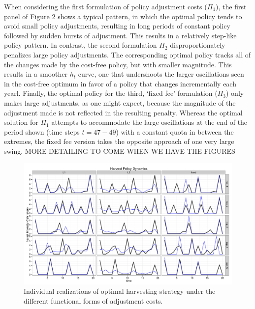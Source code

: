 \documentclass{article}\usepackage{graphicx, color}
\makeatletter
\def\maxwidth{ %
  \ifdim\Gin@nat@width>\linewidth
    \linewidth
  \else
    \Gin@nat@width
  \fi
}
\newenvironment{knitrout}{}{} %
\makeatother
\begin{document}
When considering the first formulation of policy adjustment costs ($\Pi_1$), the first  panel of Figure 2 shows a typical pattern, in which the optimal policy tends to avoid small policy adjustments, resulting in long periods of constant policy followed by sudden bursts of adjustment. This results in a relatively step-like policy pattern.  In contrast, the second formulation $\Pi_2$ disproportionately penalizes large policy adjustments. The corresponding optimal policy tracks all of the changes made by the cost-free policy, but with smaller magnitude.  This results in a smoother $h_t$ curve, one that undershoots the larger oscillations seen in the cost-free optimum in favor of a policy that changes incrementally each yearl.  Finally, the optimal policy for the third, `fixed fee' formulation ($\Pi_3$) only makes large adjustments, as one might expect, because the magnitude of the adjustment made is not reflected in the resulting penalty.  Whereas the optimal solution for $\Pi_1$ attempts to accommodate the large oscillations at the end of the period shown (time steps $t=47-49$) with a constant quota in between the extremes, the fixed fee version takes the opposite approach of one very large swing. MORE DETAILING TO COME WHEN WE HAVE THE FIGURES

\begin{figure}
\begin{knitrout}
\color{fgcolor}
\includegraphics[width=\maxwidth]{figure/Figure_2} 

\end{knitrout}

  \caption{Individual realizations of optimal harvesting strategy under the different functional forms of adjustment costs.}
\end{figure}
\end{document}
